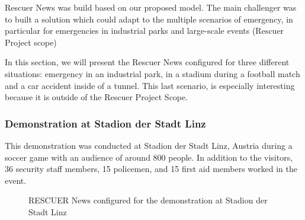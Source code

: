 Rescuer News was build based on our proposed model. The main challenger was to built a solution which could adapt to the multiple scenarios of emergency, in particular for emergencies in industrial parks and large-scale events (Rescuer Project scope) 

In this section, we will present the Rescuer News configured for three different situations: emergency in an industrial park, in a stadium during a football match and a car accident inside of a tunnel. This last scenario, is especially interesting because it is outside of the Rescuer Project Scope.






\subsubsection{Demonstration at Stadion der Stadt Linz}

This demonstration was conducted at Stadion der Stadt Linz, Austria during a soccer game with an audience of around 800 people. In addition to the visitors, 36 security staff members, 15 policemen, and 15 first aid members worked in the event. 

\begin{figure}[!h]
\centering
{}
\quad %
\caption{RESCUER News configured for the demonstration at Stadion der Stadt Linz}
\label{demoStadium}
\end{figure}

